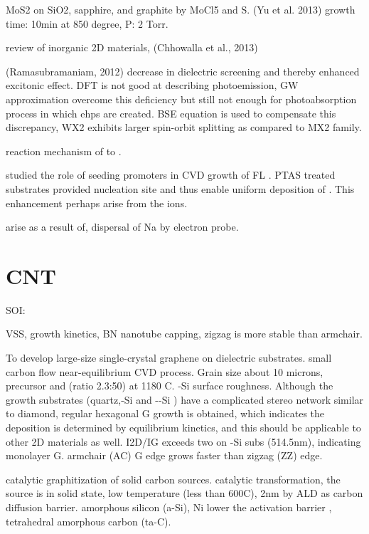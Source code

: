 MoS2 on SiO2, sapphire, and graphite by MoCl5 and S. (Yu et al. 2013)
growth time: 10min at 850 degree, P: 2 Torr.

review of inorganic 2D materials, (Chhowalla et al., 2013)

(Ramasubramaniam, 2012) decrease in dielectric screening and thereby enhanced excitonic effect.
DFT is not good at describing photoemission, GW approximation overcome this deficiency but still not enough for photoabsorption process in which ehps are created. BSE equation is used to compensate this discrepancy,
WX2 exhibits larger spin-orbit splitting as compared to MX2 family.

reaction mechanism of  to .\cite{Weber1996}

\citeauthor{Ling2014} studied the role of seeding promoters in CVD growth of FL .\cite{Ling2014} PTAS treated substrates provided nucleation site and thus enable uniform deposition of .  This enhancement perhaps arise from the  ions.



arise as a result of, dispersal of Na by electron probe.


\section{CNT}

SOI:

VSS, growth kinetics,
BN nanotube capping, zigzag is more stable than armchair. \cite{Menon1999}


To develop large-size single-crystal graphene on dielectric substrates. small carbon flow near-equilibrium CVD process. Grain size about 10 microns, precursor  and  (ratio 2.3:50) at 1180 C. -Si surface roughness. Although the growth substrates (quartz,-Si and --Si ) have a complicated stereo network similar to diamond, regular hexagonal G growth is obtained, which indicates the deposition is determined by equilibrium kinetics, and this should be applicable to other 2D materials as well. I2D/IG exceeds two on -Si subs (514.5nm), indicating monolayer G. armchair (AC) G edge grows faster than zigzag (ZZ) edge.\cite{Chen2013j}

catalytic graphitization of solid carbon sources. catalytic transformation, the source is in solid state, low temperature (less than 600C), 2nm   by ALD as carbon diffusion barrier. amorphous silicon (a-Si), Ni lower the activation barrier ,  tetrahedral amorphous carbon (ta-C).\cite{Weatherup2013}

